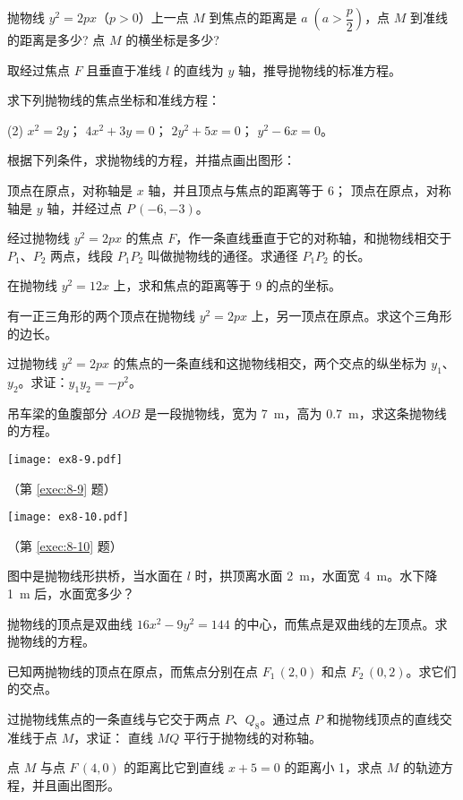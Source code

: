 \begin{Exercise}
  \begin{question}
    \item 抛物线 $y^2=2px$（$p>0$）上一点 $M$ 到焦点的距离是 $a\;\left(a> \dfrac{p}{2}\right)$，点 $M$ 到准线的距离是多少? 点 $M$ 的横坐标是多少?
    \item 取经过焦点 $F$ 且垂直于准线 $l$ 的直线为 $y$ 轴，推导抛物线的标准方程。
    \item 求下列抛物线的焦点坐标和准线方程：
    \begin{tasks}(2)
      \task $x^2=2y$；
      \task $4x^2+3y=0$；
      \task $2y^2+5x=0$；
      \task $y^2-6x=0$。
    \end{tasks}
    \item 根据下列条件，求抛物线的方程，并描点画出图形：
    \begin{tasks}
      \task 顶点在原点，对称轴是 $x$ 轴，并且顶点与焦点的距离等于 6；
      \task 顶点在原点，对称轴是 $y$ 轴，并经过点 $P\,(-6,-3)$。
    \end{tasks}
    \item 经过抛物线 $y^2=2px$ 的焦点 $F$，作一条直线垂直于它的对称轴，和抛物线相交于 $P_1$、$P_2$ 两点，线段 $P_1P_2$ 叫做抛物线的通径。求通径 $P_1P_2$ 的长。
    \item 在抛物线 $y^2=12x$ 上，求和焦点的距离等于 9 的点的坐标。
    \item 有一正三角形的两个顶点在抛物线 $y^2=2px$ 上，另一顶点在原点。求这个三角形的边长。
    \item 过抛物线 $y^2=2px$ 的焦点的一条直线和这抛物线相交，两个交点的纵坐标为 $y_1$、$y_2$。求证：$y_1y_2=-p^2$。
    \item \label{exec:8-9} 吊车梁的鱼腹部分 $AOB$ 是一段抛物线，宽为 \qty{7}{m}，高为 \qty{0.7}{m}，求这条抛物线的方程。
    \begin{figurehere}
      \begin{minipage}[b]{0.48\linewidth}\centering
        \texttt{[image: ex8-9.pdf]}
        \caption*{（第 \ref{exec:8-9} 题）}
      \end{minipage}
      \begin{minipage}[b]{0.48\linewidth}\centering
        \texttt{[image: ex8-10.pdf]}
        \caption*{（第 \ref{exec:8-10} 题）}
      \end{minipage}
    \end{figurehere}
    \item \label{exec:8-10}图中是抛物线形拱桥，当水面在 $l$ 时，拱顶离水面 \qty{2}{m}，水面宽 \qty{4}{m}。水下降 \qty{1}{m} 后，水面宽多少？
    \item 抛物线的顶点是双曲线 $16x^2-9y^2=144$ 的中心，而焦点是双曲线的左顶点。求抛物线的方程。
    \item 已知两抛物线的顶点在原点，而焦点分别在点 $F_1\,(2,0)$ 和点 $F_2\,(0,2)$。求它们的交点。
    \item 过抛物线焦点的一条直线与它交于两点 $P$、$Q_8$。通过点 $P$ 和抛物线顶点的直线交准线于点 $M$，求证： 直线 $MQ$ 平行于抛物线的对称轴。
    \item 点 $M$ 与点 $F\,(4,0)$ 的距离比它到直线 $x+5=0$ 的距离小 1，求点 $M$ 的轨迹方程，并且画出图形。
  \end{question}
\end{Exercise}

